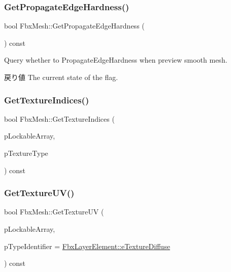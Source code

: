 \subsubsection{\texorpdfstring{Get\+Propagate\+Edge\+Hardness()}{GetPropagateEdgeHardness()}}
{\footnotesize\ttfamily bool Fbx\+Mesh\+::\+Get\+Propagate\+Edge\+Hardness (\begin{DoxyParamCaption}{ }\end{DoxyParamCaption}) const}

Query whether to Propagate\+Edge\+Hardness when preview smooth mesh. \begin{DoxyReturn}{戻り値}
The current state of the flag. 
\end{DoxyReturn}
\mbox{\label{class_fbx_mesh_a33c7d29e88d7bb03e0343daca267d770}} 
\subsubsection{\texorpdfstring{Get\+Texture\+Indices()}{GetTextureIndices()}}
{\footnotesize\ttfamily bool Fbx\+Mesh\+::\+Get\+Texture\+Indices (\begin{DoxyParamCaption}\item[{\hyperlink{class_fbx_layer_element_array_template}{Fbx\+Layer\+Element\+Array\+Template}$<$ int $>$ $\ast$$\ast$}]{p\+Lockable\+Array,  }\item[{\hyperlink{class_fbx_layer_element_a8c95c5cd880b56c776acd379bd86f42c}{Fbx\+Layer\+Element\+::\+E\+Type}}]{p\+Texture\+Type }\end{DoxyParamCaption}) const}

\mbox{\label{class_fbx_mesh_acb576494ab0812b3a81207d4b3423a5c}} 
\subsubsection{\texorpdfstring{Get\+Texture\+U\+V()}{GetTextureUV()}}
{\footnotesize\ttfamily bool Fbx\+Mesh\+::\+Get\+Texture\+UV (\begin{DoxyParamCaption}\item[{\hyperlink{class_fbx_layer_element_array_template}{Fbx\+Layer\+Element\+Array\+Template}$<$ \hyperlink{class_fbx_vector2}{Fbx\+Vector2} $>$ $\ast$$\ast$}]{p\+Lockable\+Array,  }\item[{\hyperlink{class_fbx_layer_element_a8c95c5cd880b56c776acd379bd86f42c}{Fbx\+Layer\+Element\+::\+E\+Type}}]{p\+Type\+Identifier = {\ttfamily \hyperlink{class_fbx_layer_element_a8c95c5cd880b56c776acd379bd86f42ca09829e6ecf512e7ae04d9ad8de1342fa}{Fbx\+Layer\+Element\+::e\+Texture\+Diffuse}} }\end{DoxyParamCaption}) const}

